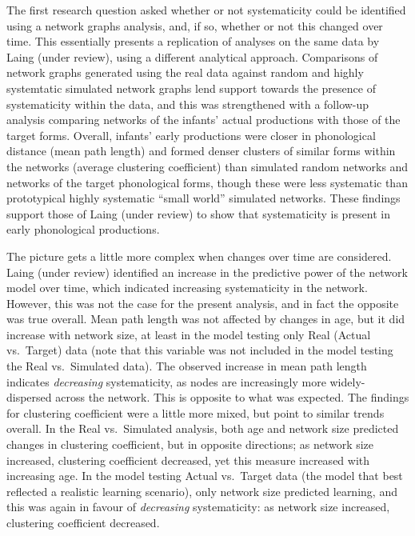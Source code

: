 \documentclass[
  man]{apa6}
\begin{document}
The first research question asked whether or not systematicity could be identified using a network graphs analysis, and, if so, whether or not this changed over time. This essentially presents a replication of analyses on the same data by Laing (under review), using a different analytical approach. Comparisons of network graphs generated using the real data against random and highly systemtatic simulated network graphs lend support towards the presence of systematicity within the data, and this was strengthened with a follow-up analysis comparing networks of the infants' actual productions with those of the target forms. Overall, infants' early productions were closer in phonological distance (mean path length) and formed denser clusters of similar forms within the networks (average clustering coefficient) than simulated random networks and networks of the target phonological forms, though these were less systematic than prototypical highly systematic ``small world'' simulated networks. These findings support those of Laing (under review) to show that systematicity is present in early phonological productions.

The picture gets a little more complex when changes over time are considered. Laing (under review) identified an increase in the predictive power of the network model over time, which indicated increasing systematicity in the network. However, this was not the case for the present analysis, and in fact the opposite was true overall. Mean path length was not affected by changes in age, but it did increase with network size, at least in the model testing only Real (Actual vs.~Target) data (note that this variable was not included in the model testing the Real vs.~Simulated data). The observed increase in mean path length indicates \emph{decreasing} systematicity, as nodes are increasingly more widely-dispersed across the network. This is opposite to what was expected. The findings for clustering coefficient were a little more mixed, but point to similar trends overall. In the Real vs.~Simulated analysis, both age and network size predicted changes in clustering coefficient, but in opposite directions; as network size increased, clustering coefficient decreased, yet this measure increased with increasing age. In the model testing Actual vs.~Target data (the model that best reflected a realistic learning scenario), only network size predicted learning, and this was again in favour of \emph{decreasing} systematicity: as network size increased, clustering coefficient decreased.
\end{document}
